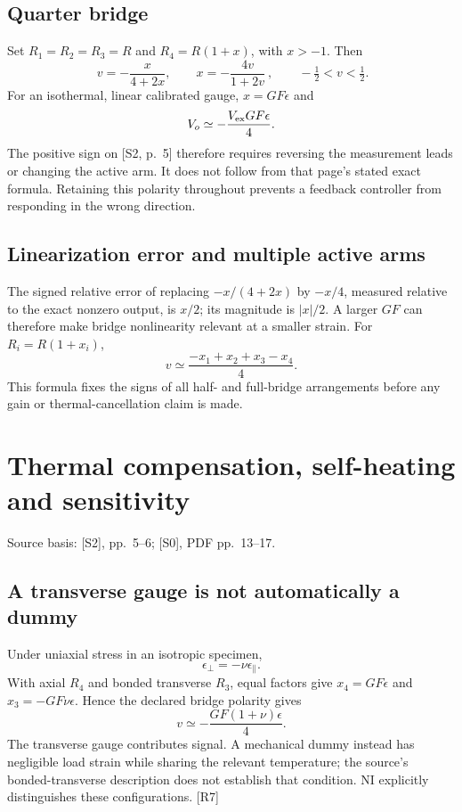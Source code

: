 \documentclass[10pt,a4paper]{article}
\numberwithin{equation}{section}
\newcommand{\src}[1]{\textcolor{muted}{\footnotesize Source basis: #1.}}
\newcommand{\newpart}{\clearpage}
\begin{document}
\subsection*{Quarter bridge}
Set $R_1=R_2=R_3=R$ and $R_4=R(1+x)$, with $x>-1$. Then
\begin{equation}
\boxed{\ v=-\frac{x}{4+2x},\qquad x=-\frac{4v}{1+2v}\ },
\qquad -\tfrac12<v<\tfrac12.
\label{eq:quarter}
\end{equation}
For an isothermal, linear calibrated gauge, $x=GF\epsilon$ and
\begin{equation}
V_o\simeq-\frac{V_{\rm ex}GF\epsilon}{4}.
\end{equation}
The positive sign on [S2, p.~5] therefore requires reversing the measurement leads or changing the active arm. It does not follow from that page's stated exact formula. Retaining this polarity throughout prevents a feedback controller from responding in the wrong direction.

\subsection*{Linearization error and multiple active arms}
The signed relative error of replacing $-x/(4+2x)$ by $-x/4$, measured relative to the exact nonzero output, is $x/2$; its magnitude is $|x|/2$. A larger $GF$ can therefore make bridge nonlinearity relevant at a smaller strain. For $R_i=R(1+x_i)$,
\begin{equation}
v\simeq\frac{-x_1+x_2+x_3-x_4}{4}.
\end{equation}
This formula fixes the signs of all half- and full-bridge arrangements before any gain or thermal-cancellation claim is made.

\newpart
\section{Thermal compensation, self-heating and sensitivity}
\label{sec:bias}
\src{[S2], pp.~5--6; [S0], PDF pp.~13--17}

\subsection*{A transverse gauge is not automatically a dummy}
Under uniaxial stress in an isotropic specimen,
\begin{equation}
\epsilon_\perp=-\nu\epsilon_\parallel.
\end{equation}
With axial $R_4$ and bonded transverse $R_3$, equal factors give $x_4=GF\epsilon$ and $x_3=-GF\nu\epsilon$. Hence the declared bridge polarity gives
\begin{equation}
v\simeq-\frac{GF(1+\nu)\epsilon}{4}.
\end{equation}
The transverse gauge contributes signal. A mechanical dummy instead has negligible load strain while sharing the relevant temperature; the source's bonded-transverse description does not establish that condition. NI explicitly distinguishes these configurations. [R7]
\end{document}
